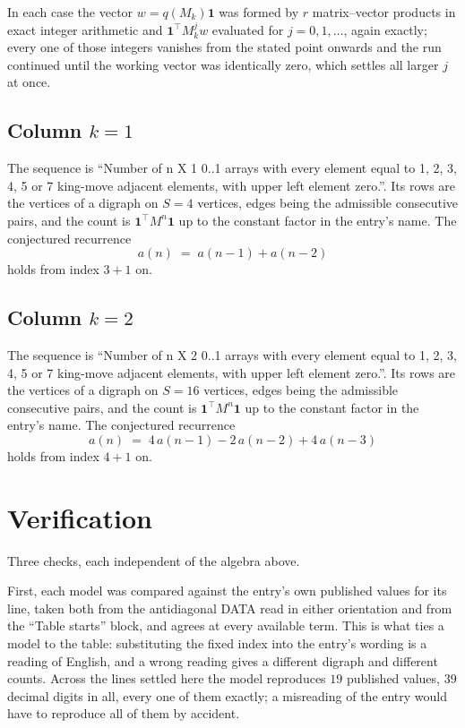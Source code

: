 \documentclass[11pt,a4paper]{article}
\theoremstyle{plain}
\theoremstyle{definition}
\begin{document}
In each case the vector $w=q(M_k)\mathbf{1}$ was formed by $r$ matrix--vector products in
exact integer arithmetic and $\mathbf{1}^{\!\top}M_k^{j}w$ evaluated for $j=0,1,\dots$,
again exactly; every one of those integers vanishes from the stated point onwards and the run
continued until the working vector was identically zero, which settles all larger $j$ at once.

\subsection*{Column $k$$=1$}
The sequence is ``Number of n X 1 0..1 arrays with every element equal to 1, 2, 3, 4, 5 or 7 king-move adjacent elements, with upper left element zero.''. Its rows are the vertices of a digraph on
$S=4$ vertices, edges being the admissible consecutive pairs, and the count is
$\mathbf{1}^{\!\top}M^{n}\mathbf{1}$ up to the constant factor in the entry's name.
The conjectured recurrence
\[
a(n)\;=\;a(n-1) + a(n-2)
\]
holds from index $3+1$ on.

\subsection*{Column $k$$=2$}
The sequence is ``Number of n X 2 0..1 arrays with every element equal to 1, 2, 3, 4, 5 or 7 king-move adjacent elements, with upper left element zero.''. Its rows are the vertices of a digraph on
$S=16$ vertices, edges being the admissible consecutive pairs, and the count is
$\mathbf{1}^{\!\top}M^{n}\mathbf{1}$ up to the constant factor in the entry's name.
The conjectured recurrence
\[
a(n)\;=\;4\,a(n-1) - 2\,a(n-2) + 4\,a(n-3)
\]
holds from index $4+1$ on.

\section{Verification}

Three checks, each independent of the algebra above.

First, each model was compared against the entry's own published values for its line, taken
both from the antidiagonal DATA read in either orientation and from the ``Table starts''
block, and agrees at every available term. This is what ties a model to the table:
substituting the fixed index into the entry's wording is a reading of English, and a wrong
reading gives a different digraph and different counts. Across the lines settled here the
model reproduces $19$ published values, $39$ decimal digits in all, every one of
them exactly; a misreading of the entry would have to reproduce all of them by accident.
\end{document}
